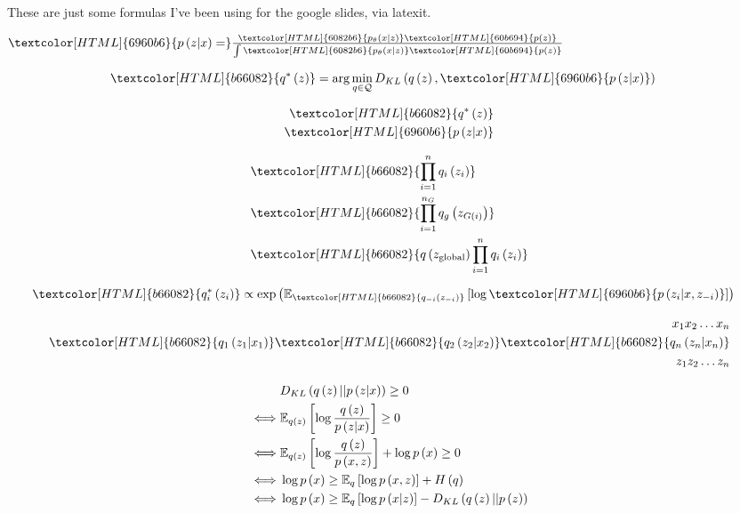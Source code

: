 \documentclass{article}
\title{}
\author{Kris Sankaran}
\begin{document}
These are just some formulas I've been using for the google slides, via latexit.

$\textcolor[HTML]{6960b6}{p\left(z\vert x\right) = }\frac{\textcolor[HTML]{6082b6}{p_{\theta}\left(x \vert z\right)}\textcolor[HTML]{60b694}{p\left(z\right)}}{\int \textcolor[HTML]{6082b6}{p_{\theta}\left(x \vert z\right)} \textcolor[HTML]{60b694}{p\left(z\right)}}$


\begin{align*}
  \textcolor[HTML]{b66082}{q^{\ast}\left(z\right)} &= \arg\min_{q \in \mathcal{Q}} D_{KL}\left(q\left(z\right), \textcolor[HTML]{6960b6}{p\left(z \vert x\right)}\right)
\end{align*}

\begin{align*}
   \textcolor[HTML]{b66082}{q^{\ast}\left(z\right)} \\
   \textcolor[HTML]{6960b6}{p\left(z \vert x\right)}
\end{align*}

\begin{align*}
  &\textcolor[HTML]{b66082}{\prod_{i = 1}^{n} q_{i}\left(z_{i}\right)} \\
  &\textcolor[HTML]{b66082}{\prod_{i = 1}^{n_{G}} q_{g}\left(z_{G\left(i\right)}\right)} \\
  &\textcolor[HTML]{b66082}{q\left(z_{\text{global}}\right)\prod_{i = 1}^{n}q_{i}\left(z_{i}\right)}
\end{align*}

\begin{align*}
  \textcolor[HTML]{b66082}{q_{i}^{\ast}\left(z_{i}\right)} &\propto \exp{\Esubarg{\textcolor[HTML]{b66082}{q_{-i}\left(z_{-i}\right)}}{\log \textcolor[HTML]{6960b6}{p\left(z_{i} \vert x, z_{-i}\right)}}}
\end{align*}

\begin{align*}
  x_{1} x_2 \dots x_n \\
  \textcolor[HTML]{b66082}{q_{1}\left(z_{1} \vert x_{1}\right)}  \textcolor[HTML]{b66082}{q_{2}\left(z_{2} \vert x_{2}\right)} \textcolor[HTML]{b66082}{q_{n}\left(z_{n} \vert x_{n}\right)} \\
  z_{1} z_2 \dots z_n \\
\end{align*}

\begin{align*}
  &D_{KL}\left(q\left(z\right) \vert \vert p\left(z \vert x\right)\right) \geq 0 \\
  \iff &\mathbb{E}_{q\left(z\right)}\left[{\log \frac{q\left(z\right)}{p\left(z \vert x\right)}}\right] \geq 0 \\
  \iff &\mathbb{E}_{q\left(z\right)}\left[{\log \frac{q\left(z\right)}{p\left(x, z\right)}}\right] + \log p\left(x\right) \geq 0 \\
  \iff &\log p\left(x\right) \geq \mathbb{E}_{q}\left[{\log p\left(x, z\right)}\right] + H\left(q\right) \\
  \iff &\log p\left(x\right) \geq \mathbb{E}_{q}\left[{\log p\left(x \vert z\right)}\right] - D_{KL}\left(q\left(z\right) \vert \vert p\left(z\right)\right)
\end{align*}
\end{document}

